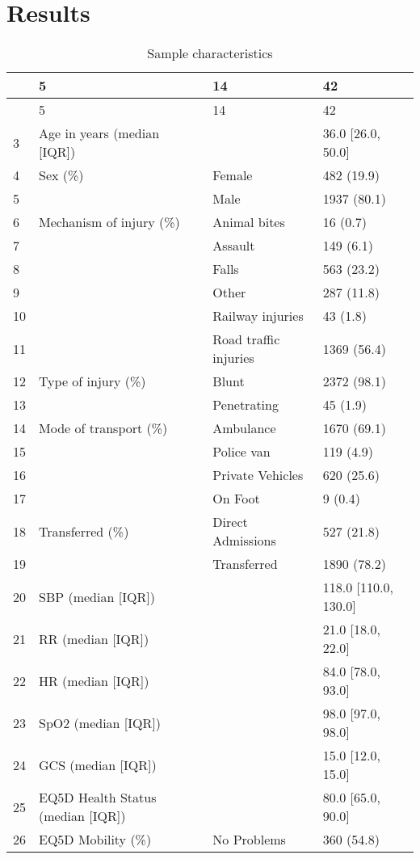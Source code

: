 \documentclass[
]{article}
\begin{document}
\hypertarget{results}{%
\section{Results}\label{results}}

\begin{longtable}[]{@{}llll@{}}
\caption{Sample characteristics}\tabularnewline
\toprule
& 5 & 14 & 42 \\
\midrule
\endfirsthead
\toprule
& 5 & 14 & 42 \\
\midrule
\endhead
3 & Age in years (median {[}IQR{]}) & & 36.0 {[}26.0, 50.0{]} \\
4 & Sex (\%) & Female & 482 (19.9) \\
5 & & Male & 1937 (80.1) \\
6 & Mechanism of injury (\%) & Animal bites & 16 (0.7) \\
7 & & Assault & 149 (6.1) \\
8 & & Falls & 563 (23.2) \\
9 & & Other & 287 (11.8) \\
10 & & Railway injuries & 43 (1.8) \\
11 & & Road traffic injuries & 1369 (56.4) \\
12 & Type of injury (\%) & Blunt & 2372 (98.1) \\
13 & & Penetrating & 45 (1.9) \\
14 & Mode of transport (\%) & Ambulance & 1670 (69.1) \\
15 & & Police van & 119 (4.9) \\
16 & & Private Vehicles & 620 (25.6) \\
17 & & On Foot & 9 (0.4) \\
18 & Transferred (\%) & Direct Admissions & 527 (21.8) \\
19 & & Transferred & 1890 (78.2) \\
20 & SBP (median {[}IQR{]}) & & 118.0 {[}110.0, 130.0{]} \\
21 & RR (median {[}IQR{]}) & & 21.0 {[}18.0, 22.0{]} \\
22 & HR (median {[}IQR{]}) & & 84.0 {[}78.0, 93.0{]} \\
23 & SpO2 (median {[}IQR{]}) & & 98.0 {[}97.0, 98.0{]} \\
24 & GCS (median {[}IQR{]}) & & 15.0 {[}12.0, 15.0{]} \\
25 & EQ5D Health Status (median {[}IQR{]}) & & 80.0 {[}65.0, 90.0{]} \\
26 & EQ5D Mobility (\%) & No Problems & 360 (54.8) \\

\end{longtable}
\end{document}
